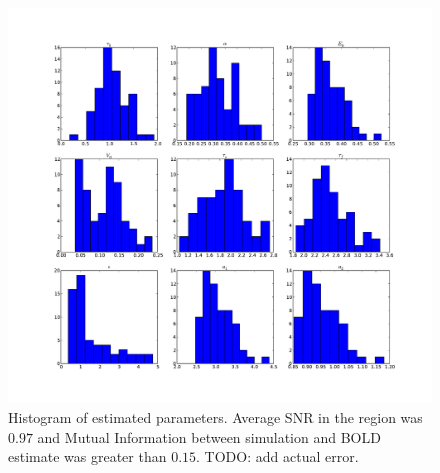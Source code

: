 \documentclass[journal]{./IEEEtran}
\begin{document}
\begin{figure}[!t] %
\centering
\includegraphics[clip=true,trim=2.5cm 2cm 2cm 1cm,width=15cm]{images/slicesim_hist2}
\caption{Histogram of estimated parameters. Average SNR in the region was 
$0.97$ and Mutual Information between simulation and BOLD estimate was greater 
than $0.15$. TODO: add actual error.}
\label{fig:slicesim_hist2}
\end{figure}
\end{document}
